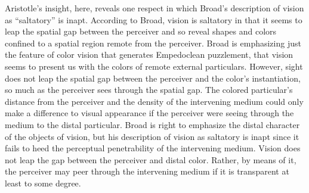 Aristotle's insight, here, reveals one respect in which Broad's \citeyearpar{Broad:1952kx} description of vision as ``saltatory'' is inapt. According to Broad, vision is saltatory in that it seems to leap the spatial gap between the perceiver and so reveal shapes and colors confined to a spatial region remote from the perceiver. Broad is emphasizing just the feature of color vision that generates Empedoclean puzzlement, that vision seems to present us with the colors of remote external particulars. However, sight does not leap the spatial gap between the perceiver and the color's instantiation, so much as the perceiver sees through the spatial gap. The colored particular's distance from the perceiver and the density of the intervening medium could only make a difference to visual appearance if the perceiver were seeing through the medium to the distal particular. Broad is right to emphasize the distal character of the objects of vision, but his description of vision as saltatory is inapt since it fails to heed the perceptual penetrability of the intervening medium. Vision does not leap the gap between the perceiver and distal color. Rather, by means of it, the perceiver may peer through the intervening medium if it is transparent at least to some degree.

